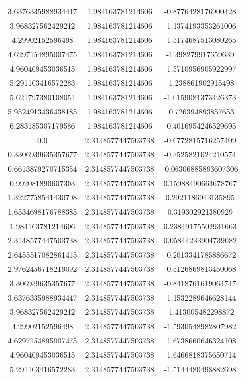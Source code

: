 \begin{table}
\begin{tabular}{ccc}
3.6376335988934447 & 1.984163781214606 & -0.8776428176900428 \\
3.968327562429212 & 1.984163781214606 & -1.1374193353261006 \\
4.29902152596498 & 1.984163781214606 & -1.3174687513080265 \\
4.6297154895007475 & 1.984163781214606 & -1.398279917659639 \\
4.960409453036515 & 1.984163781214606 & -1.3710956905922997 \\
5.291103416572283 & 1.984163781214606 & -1.238861902915498 \\
5.621797380108051 & 1.984163781214606 & -1.0159081373426373 \\
5.9524913436438185 & 1.984163781214606 & -0.726394893857653 \\
6.283185307179586 & 1.984163781214606 & -0.4016954246529695 \\
0.0 & 2.3148577447503738 & -0.6772815716257409 \\
0.3306939635357677 & 2.3148577447503738 & -0.3525821024210574 \\
0.6613879270715354 & 2.3148577447503738 & -0.06306885893607306 \\
0.992081890607303 & 2.3148577447503738 & 0.15988490663678767 \\
1.3227758541430708 & 2.3148577447503738 & 0.2921186943135895 \\
1.6534698176788385 & 2.3148577447503738 & 0.319302921380929 \\
1.984163781214606 & 2.3148577447503738 & 0.23849175502931663 \\
2.3148577447503738 & 2.3148577447503738 & 0.05844233904739082 \\
2.6455517082861415 & 2.3148577447503738 & -0.2013341785886672 \\
2.9762456718219092 & 2.3148577447503738 & -0.5126869813450068 \\
3.306939635357677 & 2.3148577447503738 & -0.8418761619064747 \\
3.6376335988934447 & 2.3148577447503738 & -1.1532289646628144 \\
3.968327562429212 & 2.3148577447503738 & -1.413005482298872 \\
4.29902152596498 & 2.3148577447503738 & -1.5930548982807982 \\
4.6297154895007475 & 2.3148577447503738 & -1.6738660646324108 \\
4.960409453036515 & 2.3148577447503738 & -1.6466818375650714 \\
5.291103416572283 & 2.3148577447503738 & -1.5144480498882698 \\

\end{tabular}
\end{table}
